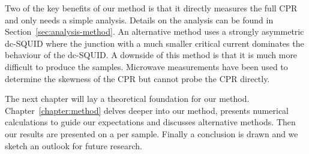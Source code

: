Two of the key benefits of our method is that it directly measures the full CPR and only needs a simple analysis. Details on the analysis can be found in Section~\ref{sec:analysis-method}. An alternative method uses a strongly asymmetric dc-SQUID where the junction with a much smaller critical current dominates the behaviour of the dc-SQUID.\cite{muraniBallisticEdgeStates2017,dellaroccaMeasurementCurrentPhaseRelation2007} A downside of this method is that it is much more difficult to produce the samples. Microwave measurements have been used to determine the skewness of the CPR but cannot probe the CPR directly.\cite{schmidtProbingCurrentphaseRelation2020}


The next chapter will lay a theoretical foundation for our method. Chapter~\ref{chapter:method} delves deeper into our method, presents numerical calculations to guide our expectations and discusses alternative methods. Then our results are presented on a per sample. Finally a conclusion is drawn and we sketch an outlook for future research.